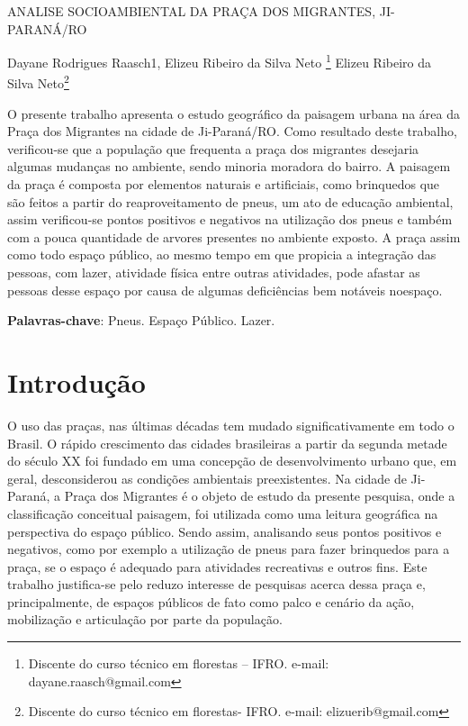 \documentclass[article,12pt,onesidea,4paper,english,brazil]{abntex2}
\begin{document}
	
	
	\frenchspacing 
	
	\begin{center}
		\LARGE ANALISE SOCIOAMBIENTAL DA PRAÇA DOS MIGRANTES, JI-PARANÁ/RO
		
		\normalsize
	Dayane Rodrigues Raasch1, Elizeu Ribeiro da Silva Neto \footnote{Discente do curso técnico em florestas – IFRO. e-mail: dayane.raasch@gmail.com} 
	Elizeu Ribeiro da Silva Neto\footnote{Discente do curso técnico em florestas- IFRO. e-mail: elizuerib@gmail.com} 
	
	\end{center}
	
	\begin{resumoumacoluna}
		O presente trabalho apresenta o estudo geográfico da paisagem urbana na área da Praça dos Migrantes na cidade de Ji-Paraná/RO. Como resultado deste trabalho, verificou-se que a população que frequenta a praça dos migrantes desejaria algumas mudanças no ambiente, sendo minoria moradora do bairro. A paisagem da praça é composta por elementos naturais e artificiais, como brinquedos que são feitos a partir do reaproveitamento de pneus, um ato de educação ambiental, assim verificou-se pontos positivos e negativos na utilização dos pneus e também com a pouca quantidade de arvores presentes no ambiente exposto. A praça assim como todo espaço público, ao mesmo tempo em que propicia a integração das pessoas, com lazer, atividade física entre outras atividades, pode afastar as pessoas desse espaço por causa de algumas deficiências bem notáveis noespaço.
	
		
		\vspace{\onelineskip}
		
		\noindent
		\textbf{Palavras-chave}: Pneus. Espaço Público. Lazer.
	\end{resumoumacoluna}
	
	\textual
	
	\section*{Introdução}
	
	O uso das praças, nas últimas décadas tem mudado significativamente em todo o Brasil. O rápido crescimento das cidades brasileiras a partir da segunda metade do século XX foi fundado em uma concepção de desenvolvimento urbano que, em geral, desconsiderou as condições ambientais preexistentes.
	Na cidade de Ji-Paraná, a Praça dos Migrantes é o objeto de estudo da presente pesquisa, onde a classificação conceitual paisagem, foi utilizada como uma leitura geográfica na perspectiva do espaço público. Sendo assim, analisando seus pontos positivos e negativos, como por exemplo a utilização de pneus para fazer brinquedos para a praça, se o espaço é adequado para atividades recreativas e outros fins.
	Este trabalho justifica-se pelo reduzo interesse de pesquisas acerca dessa praça e, principalmente, de espaços públicos de fato como palco e cenário da ação, mobilização e articulação por parte da população.
	
\end{document}
